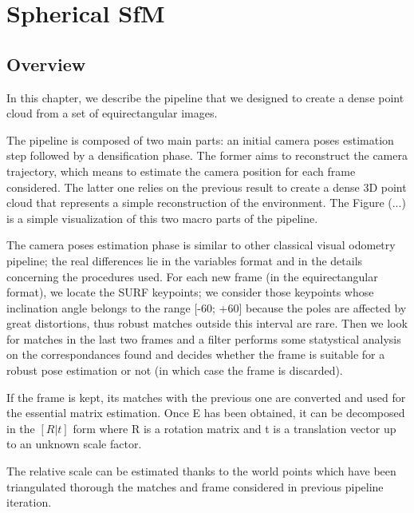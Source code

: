 \chapter{Spherical SfM}
\section{Overview}
In this chapter, we describe the pipeline that we designed to create a dense point cloud from a set of equirectangular images.

The pipeline is composed of two main parts: an initial camera poses estimation
step followed by a densification phase. The former aims to reconstruct the 
camera trajectory, which means to estimate the camera position for each frame 
considered. The latter one relies on the previous result to create a dense 
3D point cloud that represents a simple reconstruction of the environment.
The Figure (...)
is a simple visualization of this two macro parts of the 
pipeline.
\begin{figure}
    \centering
    \def\svgwidth{\columnwidth}
    
\end{figure}

The camera poses estimation phase is similar to other classical visual 
odometry pipeline; the real differences lie in the variables format and in 
the details concerning the procedures used. For each new frame 
(in the equirectangular format), we locate the
SURF keypoints; we consider those keypoints whose inclination angle belongs 
to the range [-60\degree; +60\degree] because the poles are affected by great 
distortions, thus robust matches outside this interval are rare.
Then we look for matches in the last two frames and a filter performs some 
statystical analysis on the correspondances found and decides whether the frame 
is suitable for a robust pose estimation or not (in which case the frame is 
discarded).

If the frame is kept, its matches with the previous one are converted
and used for the essential matrix estimation. Once E has been obtained, 
it can be decomposed in the \([R|t]\) form where R is a rotation matrix 
and t is a translation vector up to an unknown scale factor.

The relative scale can be estimated thanks to the world points which have been 
triangulated thorough the matches and frame considered in previous pipeline 
iteration.

